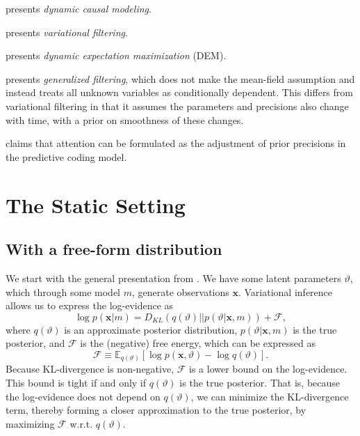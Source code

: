 \noindent \cite{friston2003dynamic} presents \textit{dynamic causal modeling}.
\newline

\noindent \cite{friston2008variational} presents \textit{variational filtering}.
\newline

\noindent \cite{friston2008DEM} presents \textit{dynamic expectation maximization} (DEM).
\newline

\noindent \cite{friston2010generalised} presents \textit{generalized filtering}, which does not make the mean-field assumption and instead treats all unknown variables as conditionally dependent. This differs from variational filtering \cite{friston2008variational} in that it assumes the parameters and precisions also change with time, with a prior on smoothness of these changes.
\newline

\noindent \cite{feldman2010attention} claims that attention can be formulated as the adjustment of prior precisions in the predictive coding model.
\newline

\section{The Static Setting}

\subsection{With a free-form distribution}

We start with the general presentation from \cite{friston2008DEM}. We have some latent parameters $\vartheta$, which through some model $m$, generate observations $\mathbf{x}$. Variational inference allows us to express the log-evidence as
\begin{equation}
	\log p (\mathbf{x} | m) = D_{KL} ( q (\vartheta) || p (\vartheta | \mathbf{x} , m)) + \mathcal{F},
\end{equation}
where $q (\vartheta)$ is an approximate posterior distribution, $p (\vartheta | \mathbf{x} , m)$ is the true posterior, and $\mathcal{F}$ is the (negative) free energy, which can be expressed as
\begin{equation}
	\mathcal{F} \equiv \mathbb{E}_{q (\vartheta)} \left[ \log p (\mathbf{x} , \vartheta) - \log q (\vartheta) \right].
\end{equation}
Because KL-divergence is non-negative, $\mathcal{F}$ is a lower bound on the log-evidence. This bound is tight if and only if $q (\vartheta)$ is the true posterior. That is, because the log-evidence does not depend on $q (\vartheta)$, we can minimize the KL-divergence term, thereby forming a closer approximation to the true posterior, by maximizing $\mathcal{F}$ w.r.t. $q (\vartheta)$.


